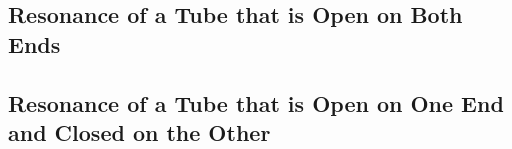 	
	\subsection{Resonance of a Tube that is Open on Both Ends}
	\subsection{Resonance of a Tube that is Open on One End and Closed on the Other}

	
	
	
	
	

	
	
	

	

	


